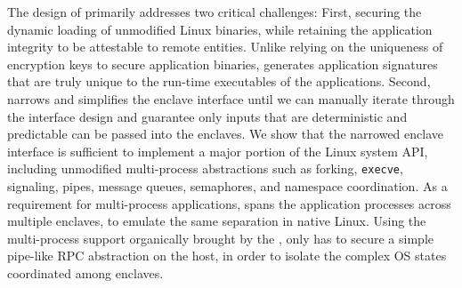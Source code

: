 

The design of \graphenesgx{} primarily addresses two critical challenges:
First, securing the dynamic loading of unmodified Linux binaries,
while retaining the application integrity to be attestable to remote entities.
Unlike \haven{} relying on the uniqueness of encryption keys to secure application binaries,
\graphenesgx{} generates application signatures that are truly unique to the run-time executables of the applications.
Second, \graphenesgx{} narrows and simplifies the enclave interface until we can manually iterate through the interface design and guarantee only inputs that are deterministic and predictable can be passed into the enclaves.
We show that the narrowed enclave interface is sufficient to implement a major portion of the Linux system API,
including unmodified multi-process abstractions such as 
forking, {\tt execve}, signaling, pipes, message queues, semaphores, and namespace coordination.
As a requirement for multi-process applications, \graphenesgx{} spans the application processes across multiple enclaves,
to emulate the same separation in native Linux.
Using the multi-process support organically brought by the \graphene{} \libos{}, \graphenesgx{} only has to secure a simple pipe-like RPC abstraction on the host, in order to isolate the complex OS states coordinated among enclaves.

